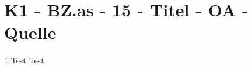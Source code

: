 \section{K1 - BZ.as - 15 - Titel - OA - Quelle}

\begin{langesbeispiel} \item[1] %
Test Test
\end{langesbeispiel}